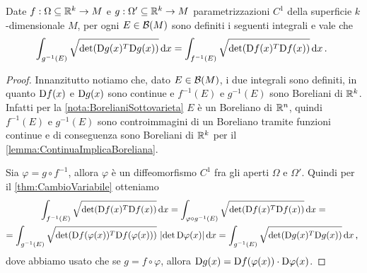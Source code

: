 \begin{lemma}\label{lemma:InvarianzaImmersione}
	Date $f:\Omega\subseteq\mathbb R^k\to M$ e $g:\Omega'\subseteq\mathbb R^k\to M$ parametrizzazioni $C^1$ della superficie $k$-dimensionale $M$, per ogni $E\in\mathcal B(M)$ sono definiti i seguenti integrali e vale che 
	\begin{equation*}
		\int_{g^{-1}(E)}\sqrt{\det(\mathrm D g(x)^T\mathrm D g(x))}\,\mathrm d x=\int_{f^{-1}(E)}\sqrt{\det(\mathrm D f(x)^T\mathrm D f(x))}\,\mathrm d x\, \text{. }
	\end{equation*}
\end{lemma}
\begin{proof}
	Innanzitutto notiamo che, dato $E\in\mathcal B(M)$, i due integrali sono definiti, in quanto $\mathrm D f(x)$ e $\mathrm D g(x)$ sono continue e $f^{-1}(E)$ e $g^{-1}(E)$ sono Boreliani di $\mathbb R^k$. Infatti per la \cref{nota:BorelianiSottovarieta} $E$ è un Boreliano di $\mathbb R^n$, quindi $f^{-1}(E)$ e $g^{-1}(E)$ sono controimmagini di un Boreliano tramite funzioni continue e di conseguenza sono Boreliani di $\mathbb R^k$ per il \cref{lemma:ContinuaImplicaBoreliana}.

	Sia $\varphi=g\circ f^{-1}$, allora $\varphi$ è un diffeomorfismo $C^1$ fra gli aperti $\Omega$ e $\Omega'$. Quindi per il \cref{thm:CambioVariabile} otteniamo
	\begin{multline*}
		\int_{f^{-1}(E)}\sqrt{\det(\mathrm D f(x)^T\mathrm D f(x))}\,\mathrm d x=\int_{\varphi\circ g^{-1}(E)}\sqrt{\det(\mathrm D f(x)^T\mathrm D f(x))}\,\mathrm d x=\\
		=\int_{g^{-1}(E)}\sqrt{\det(\mathrm D f(\varphi(x))^T\mathrm D f(\varphi(x)))}\ \lvert\det \mathrm D \varphi(x)\rvert\,\mathrm d x=\int_{g^{-1}(E)}\sqrt{\det(\mathrm D g(x)^T\mathrm D g(x))}\,\mathrm d x\, \text{, }
	\end{multline*}
	dove abbiamo usato che se $g=f\circ \varphi$, allora $\mathrm D g(x)=\mathrm D f(\varphi(x))\cdot \mathrm D\varphi(x)$.
\end{proof}


